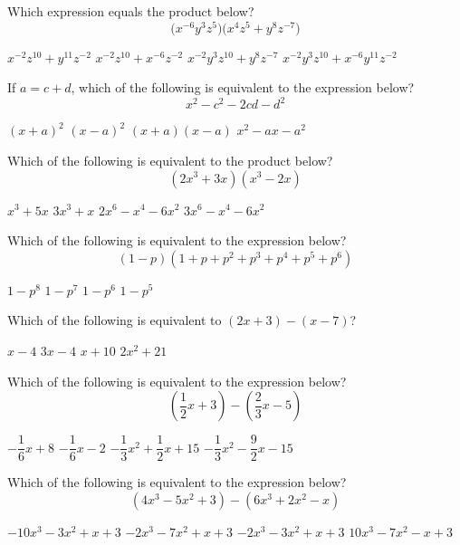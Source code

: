 \newpage


\question[1]
Which expression equals the product below?
\[
  \bigl(x^{-6} y^{3} z^{5}\bigr)\bigl(x^{4} z^{5}+y^{8} z^{-7}\bigr)
\]
\begin{choices}
  \choice $x^{-2} z^{10}+y^{11} z^{-2}$
  \choice $x^{-2} z^{10}+x^{-6} z^{-2}$
  \choice $x^{-2} y^{3} z^{10}+y^{8} z^{-7}$
  \CorrectChoice $x^{-2} y^{3} z^{10}+x^{-6} y^{11} z^{-2}$
\end{choices}

\question[1]
If $a=c+d$, which of the following is equivalent to the expression below?
\[
  x^{2}-c^{2}-2 c d-d^{2}
\]
\begin{choices}
  \choice $(x+a)^{2}$
  \choice $(x-a)^{2}$
  \CorrectChoice $(x+a)(x-a)$
  \choice $x^{2}-a x-a^{2}$
\end{choices}

\question[1]
Which of the following is equivalent to the product below?
\[
  \left(2 x^{3}+3 x\right)\left(x^{3}-2 x\right)
\]
\begin{choices}
  \choice $x^{3}+5 x$
  \choice $3 x^{3}+x$
  \CorrectChoice $2 x^{6}-x^{4}-6 x^{2}$
  \choice $3 x^{6}-x^{4}-6 x^{2}$
\end{choices}

\newpage


\question[1]
Which of the following is equivalent to the expression below?
\[
  (1-p)\left(1+p+p^{2}+p^{3}+p^{4}+p^{5}+p^{6}\right)
\]
\begin{choices}
  \choice $1-p^{8}$
  \CorrectChoice $1-p^{7}$
  \choice $1-p^{6}$
  \choice $1-p^{5}$
\end{choices}

\question[1]
Which of the following is equivalent to $(2 x+3)-(x-7)$?
\begin{choices}
  \choice $x-4$
  \choice $3 x-4$
  \CorrectChoice $x+10$
  \choice $2 x^{2}+21$
\end{choices}

\question[1]
Which of the following is equivalent to the expression below?
\[
  \left(\frac{1}{2} x+3\right)-\left(\frac{2}{3} x-5\right)
\]
\begin{choices}
  \CorrectChoice $-\dfrac{1}{6} x+8$
  \choice $-\dfrac{1}{6} x-2$
  \choice $-\dfrac{1}{3} x^{2}+\dfrac{1}{2} x+15$
  \choice $-\dfrac{1}{3} x^{2}-\dfrac{9}{2} x-15$
\end{choices}

\newpage


\question[1]
Which of the following is equivalent to the expression below?
\[
  \left(4 x^{3}-5 x^{2}+3\right)-\left(6 x^{3}+2 x^{2}-x\right)
\]
\begin{choices}
  \choice $-10 x^{3}-3 x^{2}+x+3$
  \CorrectChoice $-2 x^{3}-7 x^{2}+x+3$
  \choice $-2 x^{3}-3 x^{2}+x+3$
  \choice $10 x^{3}-7 x^{2}-x+3$
\end{choices}

